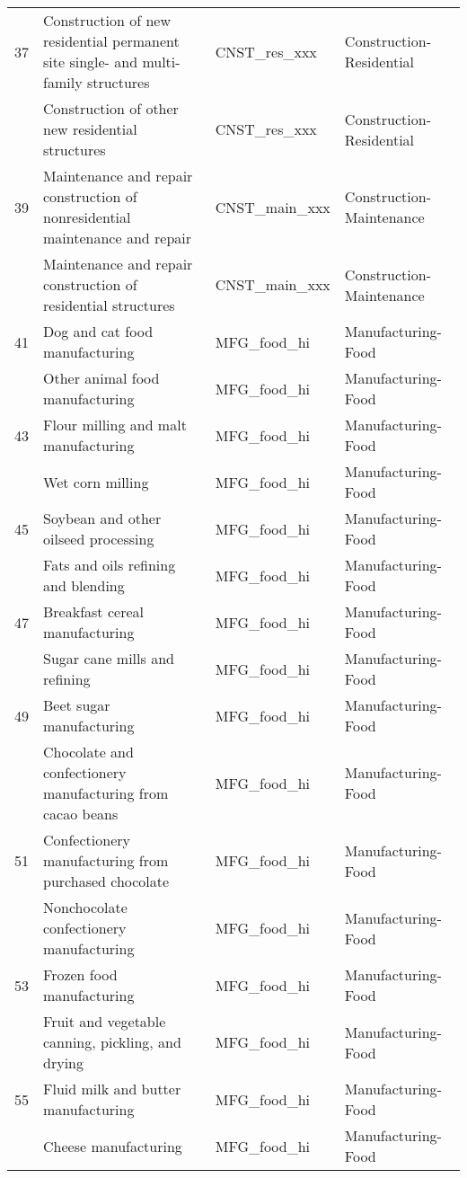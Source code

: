 \begin{landscape}
\begin{small}
\begin{longtable}{clll}
37 & Construction of new residential permanent site single- and multi-family structures & CNST\_res\_xxx & Construction-Residential \\
\gray 38 & Construction of other new residential structures & CNST\_res\_xxx & Construction-Residential \\
39 & Maintenance and repair construction of nonresidential maintenance and repair & CNST\_main\_xxx & Construction-Maintenance \\
\gray 40 & Maintenance and repair construction of residential structures & CNST\_main\_xxx & Construction-Maintenance \\
41 & Dog and cat food manufacturing & MFG\_food\_hi & Manufacturing-Food \\
\gray 42 & Other animal food manufacturing & MFG\_food\_hi & Manufacturing-Food \\
43 & Flour milling and malt manufacturing & MFG\_food\_hi & Manufacturing-Food \\
\gray 44 & Wet corn milling & MFG\_food\_hi & Manufacturing-Food \\
45 & Soybean and other oilseed processing & MFG\_food\_hi & Manufacturing-Food \\
\gray 46 & Fats and oils refining and blending & MFG\_food\_hi & Manufacturing-Food \\
47 & Breakfast cereal manufacturing & MFG\_food\_hi & Manufacturing-Food \\
\gray 48 & Sugar cane mills and refining & MFG\_food\_hi & Manufacturing-Food \\
49 & Beet sugar manufacturing & MFG\_food\_hi & Manufacturing-Food \\
\gray 50 & Chocolate and confectionery manufacturing from cacao beans & MFG\_food\_hi & Manufacturing-Food \\
51 & Confectionery manufacturing from purchased chocolate & MFG\_food\_hi & Manufacturing-Food \\
\gray 52 & Nonchocolate confectionery manufacturing & MFG\_food\_hi & Manufacturing-Food \\
53 & Frozen food manufacturing & MFG\_food\_hi & Manufacturing-Food \\
\gray 54 & Fruit and vegetable canning, pickling, and drying & MFG\_food\_hi & Manufacturing-Food \\
55 & Fluid milk and butter manufacturing & MFG\_food\_hi & Manufacturing-Food \\
\gray 56 & Cheese manufacturing & MFG\_food\_hi & Manufacturing-Food \\

\end{longtable}
\end{small}
\end{landscape}
